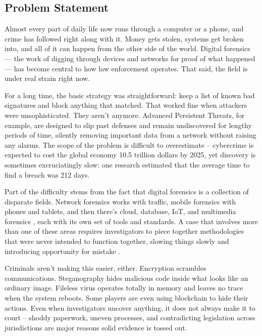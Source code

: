 \documentclass[12pt,a4paper]{article}
\begin{document}
\begin{justify}


\subsection{Problem Statement}

\vspace{0.5cm}
Almost every part of daily life now runs through a computer or a phone, and crime has followed right along with it. Money gets stolen, systems get broken into, and all of it can happen from the other side of the world. Digital forensics — the work of digging through devices and networks for proof of what happened — has become central to how law enforcement operates. That said, the field is under real strain right now.

For a long time, the basic strategy was straightforward: keep a list of known bad signatures and block anything that matched. That worked fine when attackers were unsophisticated. They aren't anymore. Advanced Persistent Threats, for example, are designed to slip past defenses and remain undiscovered for lengthy periods of time, silently removing important data from a network without raising any alarms. The scope of the problem is difficult to overestimate – cybercrime is expected to cost the global economy 10.5 trillion dollars by 2025, yet discovery is sometimes excruciatingly slow: one research estimated that the average time to find a breach was 212 days.


Part of the difficulty stems from the fact that digital forensics is a collection of disparate fields. Network forensics works with traffic, mobile forensics with phones and tablets, and then there's cloud, database, IoT, and multimedia forensics , each with its own set of tools and standards. A case that involves more than one of these areas requires investigators to piece together methodologies that were never intended to function together, slowing things slowly and introducing opportunity for mistake .


Criminals aren't making this easier, either. Encryption scrambles communications. Steganography hides malicious code inside what looks like an ordinary image. Fileless virus operates totally in memory and leaves no trace when the system reboots. Some players are even using blockchain to hide their actions. Even when investigators uncover anything, it does not always make it to court – shoddy paperwork, uneven processes, and contradicting legislation across jurisdictions are major reasons solid evidence is tossed out.



\end{justify}
\end{document}
